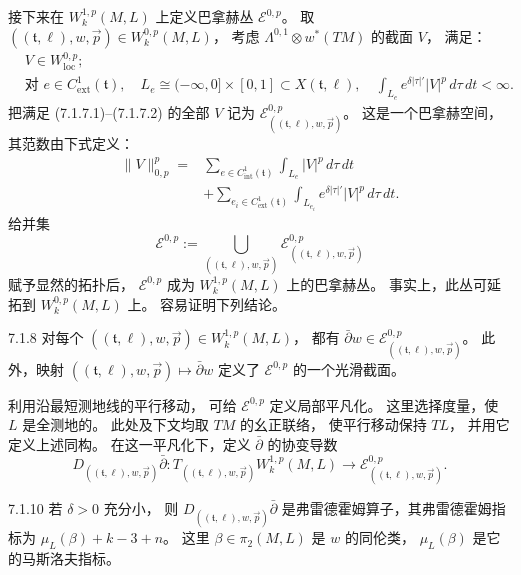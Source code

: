 接下来在 $W_k^{1,p}(M,L)$ 上定义巴拿赫丛
$\mathcal E^{0,p}$。
取 $((\mathfrak t,\ell),w,\vec p)
\in W_k^{0,p}(M,L)$，
考虑 $\Lambda^{0,1}\otimes w^*(TM)$ 的截面 $V$，
满足：
\begin{align*}
&V\in W^{0,p}_{\mathrm{loc}};
  \tag{7.1.7.1}\label{eq:7-1-7-1}\\
&\text{对 }e\in C^1_{\mathrm{ext}}(\mathfrak t),\quad
  L_e\cong(-\infty,0]\times[0,1]
  \subset X(\mathfrak t,\ell),\quad
  \int_{L_e}e^{\delta|\tau|'}|V|^p
  \,d\tau\,dt<\infty.
  \tag{7.1.7.2}\label{eq:7-1-7-2}
\end{align*}
把满足 (7.1.7.1)--(7.1.7.2) 的全部 $V$
记为 $\mathcal E^{0,p}_{((\mathfrak t,\ell),w,\vec p)}$。
这是一个巴拿赫空间，其范数由下式定义：
\begin{equation}
\begin{aligned}
\|V\|_{0,p}^p
={}&\sum_{e\in C^1_{\mathrm{int}}(\mathfrak t)}
\int_{L_e}|V|^p\,d\tau\,dt\\
&+\sum_{e_i\in C^1_{\mathrm{ext}}(\mathfrak t)}
\int_{L_{e_i}}e^{\delta|\tau|'}|V|^p\,d\tau\,dt.
\end{aligned}
\tag{7.1.7.3}\label{eq:7-1-7-3}
\end{equation}
给并集
\[
\mathcal E^{0,p}:=
\bigcup_{((\mathfrak t,\ell),w,\vec p)}
\mathcal E^{0,p}_{((\mathfrak t,\ell),w,\vec p)}
\]
赋予显然的拓扑后，
$\mathcal E^{0,p}$ 成为 $W_k^{1,p}(M,L)$
上的巴拿赫丛。
事实上，此丛可延拓到 $W_k^{0,p}(M,L)$ 上。
容易证明下列结论。

\begin{lemma}{7.1.8}\label{lem:7-1-8}
对每个
$((\mathfrak t,\ell),w,\vec p)\in W_k^{1,p}(M,L)$，
都有
$\bar\partial w\in
\mathcal E^{0,p}_{((\mathfrak t,\ell),w,\vec p)}$。
此外，映射
$((\mathfrak t,\ell),w,\vec p)\mapsto\bar\partial w$
定义了 $\mathcal E^{0,p}$ 的一个光滑截面。
\end{lemma}

利用沿最短测地线的平行移动，
可给 $\mathcal E^{0,p}$ 定义局部平凡化。
这里选择度量，使 $L$ 是全测地的。
此处及下文均取 $TM$ 的幺正联络，
使平行移动保持 $TL$，
并用它定义上述同构。
在这一平凡化下，定义 $\bar\partial$ 的协变导数
\begin{equation}
D_{((\mathfrak t,\ell),w,\vec p)}\bar\partial:
T_{((\mathfrak t,\ell),w,\vec p)}W_k^{1,p}(M,L)
\longrightarrow
\mathcal E^{0,p}_{((\mathfrak t,\ell),w,\vec p)}.
\tag{7.1.9}\label{eq:7-1-9}
\end{equation}

\begin{lemma}{7.1.10}\label{lem:7-1-10}
若 $\delta>0$ 充分小，
则 $D_{((\mathfrak t,\ell),w,\vec p)}\bar\partial$
是弗雷德霍姆算子，其弗雷德霍姆指标为
$\mu_L(\beta)+k-3+n$。
这里 $\beta\in\pi_2(M,L)$ 是 $w$ 的同伦类，
$\mu_L(\beta)$ 是它的马斯洛夫指标。
\end{lemma}

